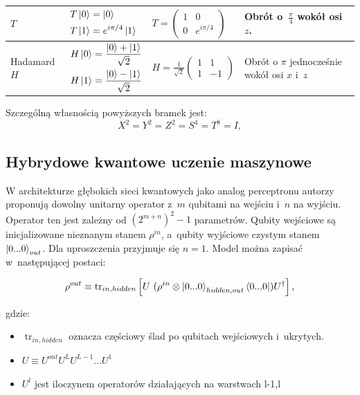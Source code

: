 \begin{table}[H]
{\begin{tabular}{l l l l}
        \hline
        $T$ & $\begin{aligned} T\ket{0} &= \ket{0} \\ T\ket{1} &= e^{i\pi/4}\ket{1} \end{aligned}$ & $T = \begin{pmatrix} 1 & 0 \\ 0 & e^{i\pi/4} \end{pmatrix}$ & Obrót o~$\frac{\pi}{4}$ wokół osi $z$. \\
        \hline
        Hadamard $H$ & $\begin{aligned} H\ket{0} &= \frac{\ket{0} + \ket{1}}{\sqrt{2}} \\ H\ket{1} &= \frac{\ket{0} - \ket{1}}{\sqrt{2}} \end{aligned}$ & $H = \frac{1}{\sqrt{2}} \begin{pmatrix} 1 & 1 \\ 1 & -1 \end{pmatrix}$ & Obrót o $\pi$ jednocześnie wokół osi $x$ i~$z$ \\
        \hline
    \end{tabular}
}

\end{table}

Szczególną własnością powyższych bramek jest:
\[X^2 = Y^2 = Z^2 = S^4 = T^8 = I,\]

\subsection{Hybrydowe kwantowe uczenie maszynowe}

W architekturze głębokich sieci kwantowych jako analog perceptronu autorzy \cite{training_deep_quantum_nn} proponują dowolny unitarny operator z~$m$ qubitami na wejściu i~$n$ na wyjściu. Operator ten jest zależny od $(2^{m+n})^2-1$ parametrów. Qubity wejściowe są inicjalizowane nieznanym stanem $\rho^{in}$, a~qubity wyjściowe czystym stanem $\ket{0...0}_{out}$. Dla uproszczenia przyjmuje się $n = 1$. Model można zapisać w~następującej postaci:

\begin{equation}\label{eq:stan_wyjscie_1}
    \rho^{out} \equiv \operatorname{tr}_{in,hidden} \left[ U~(\rho^{in} \otimes \ket{0...0}_{hidden,out}\bra{0...0}) U^{\dagger} \right],
\end{equation}

gdzie:
\begin{itemize}
    \item $\operatorname{tr}_{in,hidden}$ oznacza częściowy ślad po qubitach wejściowych i~ukrytych.
    \item $U \equiv U^{out}U^L U^{L-1} ... U^1$
    \item $U^l$ jest iloczynem operatorów działających na warstwach l-1,l
\end{itemize}

